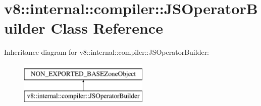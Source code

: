 \hypertarget{classv8_1_1internal_1_1compiler_1_1JSOperatorBuilder}{}\section{v8\+:\+:internal\+:\+:compiler\+:\+:J\+S\+Operator\+Builder Class Reference}
\label{classv8_1_1internal_1_1compiler_1_1JSOperatorBuilder}
Inheritance diagram for v8\+:\+:internal\+:\+:compiler\+:\+:J\+S\+Operator\+Builder\+:\begin{figure}[H]
\begin{center}
\leavevmode
\includegraphics[height=2.000000cm]{classv8_1_1internal_1_1compiler_1_1JSOperatorBuilder}
\end{center}
\end{figure}
